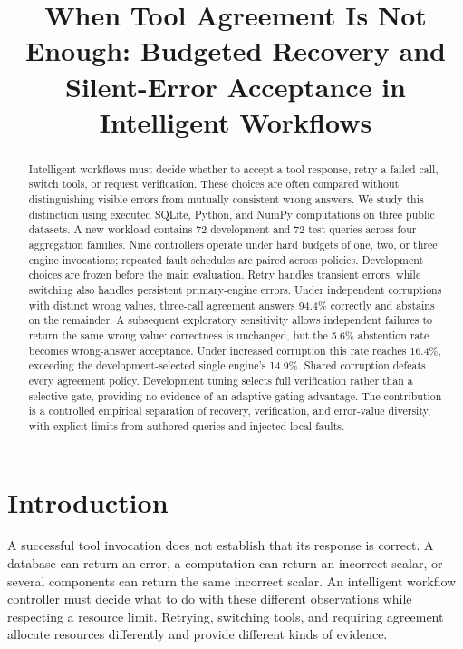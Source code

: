 \documentclass{svproc}
\begin{document}
\mainmatter
\title{When Tool Agreement Is Not Enough: Budgeted Recovery and Silent-Error Acceptance in Intelligent Workflows}
\author{}
\authorrunning{}
\institute{}
\maketitle
\begin{abstract}
Intelligent workflows must decide whether to accept a tool response, retry a failed call, switch tools, or request verification. These choices are often compared without distinguishing visible errors from mutually consistent wrong answers. We study this distinction using executed SQLite, Python, and NumPy computations on three public datasets. A new workload contains 72 development and 72 test queries across four aggregation families. Nine controllers operate under hard budgets of one, two, or three engine invocations; repeated fault schedules are paired across policies. Development choices are frozen before the main evaluation. Retry handles transient errors, while switching also handles persistent primary-engine errors. Under independent corruptions with distinct wrong values, three-call agreement answers 94.4\% correctly and abstains on the remainder. A subsequent exploratory sensitivity allows independent failures to return the same wrong value: correctness is unchanged, but the 5.6\% abstention rate becomes wrong-answer acceptance. Under increased corruption this rate reaches 16.4\%, exceeding the development-selected single engine's 14.9\%. Shared corruption defeats every agreement policy. Development tuning selects full verification rather than a selective gate, providing no evidence of an adaptive-gating advantage. The contribution is a controlled empirical separation of recovery, verification, and error-value diversity, with explicit limits from authored queries and injected local faults.
\end{abstract}

\section{Introduction}
A successful tool invocation does not establish that its response is correct. A database can return an error, a computation can return an incorrect scalar, or several components can return the same incorrect scalar. An intelligent workflow controller must decide what to do with these different observations while respecting a resource limit. Retrying, switching tools, and requiring agreement allocate resources differently and provide different kinds of evidence.
\end{document}
